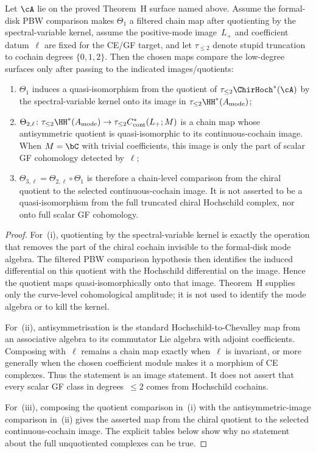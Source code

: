 \begin{theorem}
\label{thm:three-hochschild-chain-level-agreement-low-degree}
Let $\cA$ lie on the proved Theorem~H surface named above. Assume the
formal-disk PBW comparison makes $\Theta_1$ a filtered chain map after
quotienting by the spectral-variable kernel, assume the positive-mode
image~$L_+$ and coefficient datum~$\ell$ are fixed for the CE/GF target,
and let $\tau_{\le 2}$ denote stupid truncation to cochain degrees
$\{0,1,2\}$. Then the chosen maps compare the low-degree surfaces only
after passing to the indicated images/quotients:
\begin{enumerate}[label=\textup{(\roman*)}]
\item $\Theta_1$ induces a quasi-isomorphism from the quotient of
 $\tau_{\le 2}\ChirHoch^*(\cA)$ by the spectral-variable kernel onto
 its image in $\tau_{\le 2}\HH^*(A_{\mathrm{mode}})$;
\item $\Theta_{2,\ell}\colon
 \tau_{\le 2}\HH^*(A_{\mathrm{mode}}) \to
 \tau_{\le 2} C^*_{\mathrm{cont}}(L_+;M)$ is a chain map whose
 antisymmetric quotient is quasi-isomorphic to its continuous-cochain
 image. When $M=\bC$ with trivial coefficients, this image is only the
 part of scalar GF cohomology detected by~$\ell$;
\item $\Theta_{3,\ell} = \Theta_{2,\ell}\circ\Theta_1$ is therefore a
 chain-level comparison from the chiral quotient to the selected
 continuous-cochain image. It is not asserted to be a quasi-isomorphism
 from the full truncated chiral Hochschild complex, nor onto full
 scalar GF cohomology.
\end{enumerate}
\end{theorem}

\begin{proof}
For~(i), quotienting by the spectral-variable kernel is exactly the
operation that removes the part of the chiral cochain invisible to the
formal-disk mode algebra. The filtered PBW comparison hypothesis then
identifies the induced differential on this quotient with the
Hochschild differential on the image. Hence the quotient maps
quasi-isomorphically onto that image. Theorem~H supplies only the
curve-level cohomological amplitude; it is not used to identify the
mode algebra or to kill the kernel.

For~(ii), antisymmetrisation is the standard Hochschild-to-Chevalley
map from an associative algebra to its commutator Lie algebra with
adjoint coefficients. Composing with~$\ell$ remains a chain map exactly
when~$\ell$ is invariant, or more generally when the chosen coefficient
module makes it a morphism of CE complexes. Thus the statement is an
image statement. It does not assert that every scalar GF class in
degrees~$\le 2$ comes from Hochschild cochains.

For~(iii), composing the quotient comparison in~(i) with the
antisymmetric-image comparison in~(ii) gives the asserted map from the
chiral quotient to the selected continuous-cochain image. The explicit
tables below show why no statement about the full unquotiented
complexes can be true.
\end{proof}

